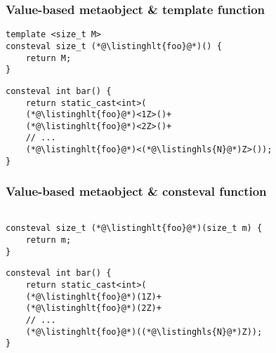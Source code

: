 \documentclass[compress,table,xcolor=table]{beamer}
\begin{document}
\begin{frame}[fragile]
  \frametitle{Value-based metaobject \& template function}
  \begin{lstlisting}[language=c++2x,basicstyle=\normalsize\ttfamily]
template <size_t M>
consteval size_t (*@\listinghlt{foo}@*)() {
	return M;
}
  \end{lstlisting}
  \vfill
  \begin{lstlisting}[language=c++2x,basicstyle=\normalsize\ttfamily]
consteval int bar() {
	return static_cast<int>(
    (*@\listinghlt{foo}@*)<1Z>()+
    (*@\listinghlt{foo}@*)<2Z>()+
    // ...
    (*@\listinghlt{foo}@*)<(*@\listinghls{N}@*)Z>());
}
  \end{lstlisting}
\end{frame}
\begin{frame}[fragile]
  \frametitle{Value-based metaobject \& consteval function}
  \begin{lstlisting}[language=c++2x,basicstyle=\normalsize\ttfamily]

consteval size_t (*@\listinghlt{foo}@*)(size_t m) {
	return m;
}
  \end{lstlisting}
  \vfill
  \begin{lstlisting}[language=c++2x,basicstyle=\normalsize\ttfamily]
consteval int bar() {
	return static_cast<int>(
    (*@\listinghlt{foo}@*)(1Z)+
    (*@\listinghlt{foo}@*)(2Z)+
    // ...
    (*@\listinghlt{foo}@*)((*@\listinghls{N}@*)Z));
}
  \end{lstlisting}
\end{frame}
\end{document}
